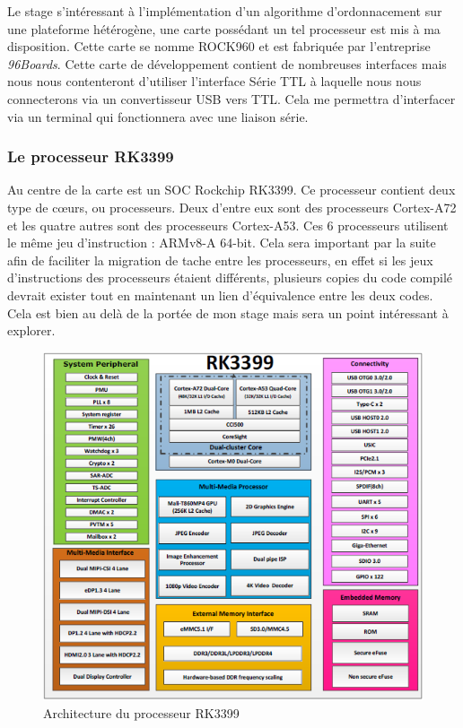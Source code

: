 Le stage s'intéressant à l'implémentation d'un algorithme d'ordonnacement sur une plateforme hétérogène, une carte possédant un tel processeur est mis à ma disposition. Cette carte se nomme ROCK960 et est fabriquée par l'entreprise \textit{96Boards}. Cette carte de développement contient de nombreuses interfaces mais nous nous contenteront d'utiliser l'interface Série TTL à laquelle nous nous connecterons via un convertisseur USB vers TTL. Cela me permettra d'interfacer via un terminal qui fonctionnera avec une liaison série. 

\subsubsection{Le processeur RK3399}
Au centre de la carte est un \gls{SOC} Rockchip RK3399. Ce processeur contient deux type de cœurs, ou processeurs. Deux d'entre eux sont des processeurs Cortex-A72 et les quatre autres sont des processeurs Cortex-A53. Ces 6 processeurs utilisent le même jeu d'instruction : ARMv8-A 64-bit. Cela sera important par la suite afin de faciliter la migration de tache entre les processeurs, en effet si les jeux d'instructions des processeurs étaient différents, plusieurs copies du code compilé devrait exister tout en maintenant un lien d'équivalence entre les deux codes. Cela est bien au delà de la portée de mon stage mais sera un point intéressant à explorer.

\begin{figure}[H]
    \centering
    \includegraphics[width=0.45\paperwidth]{Images/RK3399_Block_Diagram.png}
    \caption{Architecture du processeur RK3399}
    \label{fig:archi_rk3399}
\end{figure}

